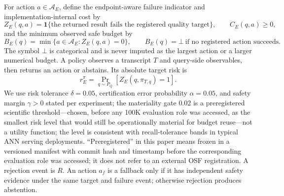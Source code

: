 \documentclass{article}
\renewcommand{\Pr}{\mathop{\mathrm{Pr}}}   %
\newcommand{\Acal}{\mathcal{A}}
\newcommand{\BOT}{\bot}
\begin{document}
For action $a\in\Acal_E$, define the endpoint-aware failure indicator and implementation-internal cost by
\begin{equation}
Z_{E}(q,a)=\mathbf{1}\{\text{the returned result fails the registered quality target}\},\qquad
C_{E}(q,a)\ge 0,
\label{eq:zc}
\end{equation}
and the minimum observed safe budget by
\begin{equation}
B_{E}(q)=\min\{a\in\Acal_{E}:Z_{E}(q,a)=0\},\qquad
B_{E}(q)=\BOT\ \text{if no registered action succeeds}.
\label{eq:bmin}
\end{equation}
The symbol $\BOT$ is categorical and is never imputed as the largest action or a larger numerical budget. A
policy observes a transcript $T$ and query-side observables, then returns an action or abstains. Its
absolute target risk is
\begin{equation}
r_{E}^{\pi}=\Pr_{q\sim P_{Q}}\!\left[Z_{E}(q,\pi_{T,q})=1\right].
\label{eq:risk}
\end{equation}
We use risk tolerance $\delta=0.05$, certification error probability $\alpha=0.05$, and safety margin
$\gamma>0$ stated per experiment; the materiality gate $0.02$ is a preregistered scientific threshold---chosen, before any 100K evaluation
role was accessed, as the smallest risk level that would still be operationally material for budget
reuse---not a utility function; the level is consistent with recall-tolerance bands in typical ANN serving
deployments. ``Preregistered'' in this paper means frozen in a versioned manifest with commit hash and
timestamp before the corresponding evaluation role was accessed; it does not refer to an external OSF
registration. A rejection event is $R$. An action $a_f$ is a fallback only if it has independent safety
evidence under the same target and failure event; otherwise rejection produces abstention.
\end{document}
